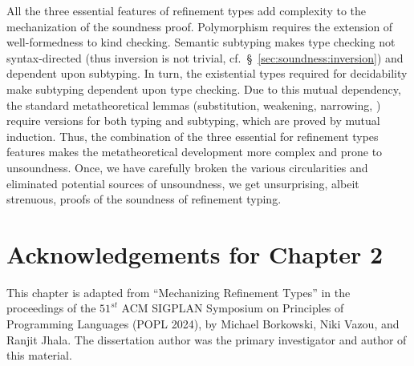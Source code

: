 %
All the three essential features of refinement types add complexity 
to the mechanization of the soundness proof.
Polymorphism requires the extension of well-formedness to kind checking.
%
Semantic subtyping makes type checking not syntax-directed
(thus inversion is not trivial, cf.~\S~\ref{sec:soundness:inversion}) and dependent upon subtyping.
%
In turn, the existential types required for decidability make subtyping dependent upon type checking.
%
Due to this mutual dependency, the standard metatheoretical lemmas (substitution, weakening, narrowing, \etc)
require versions for both typing and subtyping, which are proved by mutual induction.
Thus, the combination of the three essential for refinement types features
makes the metatheoretical development more complex and prone to unsoundness.
%
Once, we have carefully broken the various circularities
and eliminated potential sources of unsoundness, we get
unsurprising, albeit strenuous, proofs of the soundness
of refinement typing.

\section*{Acknowledgements for Chapter 2}
%
This chapter is adapted from 
``Mechanizing Refinement Types'' in the proceedings of the 
$51^{st}$ ACM SIGPLAN Symposium on Principles of Programming
Languages (POPL 2024), by Michael Borkowski, Niki Vazou, and
Ranjit Jhala.
%
The dissertation author was the primary investigator 
and author of this material.